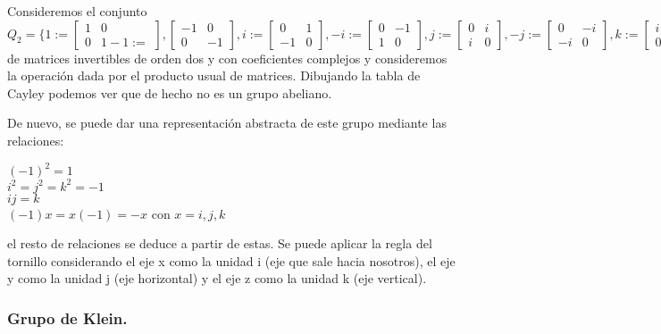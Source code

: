 \documentclass{article}
\theoremstyle{theorem-style}  %
\theoremstyle{definition-style}
\theoremstyle{example-style}
\begin{document}
Consideremos el conjunto 
$Q_2 = \{
1 := \begin{bmatrix}
    1 & 0  \\
    0 & 1 
-1 := \end{bmatrix},
\begin{bmatrix}
    -1 & 0  \\
    0 & -1 
\end{bmatrix},
i := \begin{bmatrix}
    0 & 1  \\
    -1 & 0 
\end{bmatrix},
-i := \begin{bmatrix}
    0 & -1  \\
    1 & 0 
\end{bmatrix},
j := \begin{bmatrix}
    0 & i  \\
    i & 0 
\end{bmatrix},
-j := \begin{bmatrix}
    0 & -i  \\
    -i & 0 
\end{bmatrix},
k := \begin{bmatrix}
    i & 0  \\
    0 & -i 
\end{bmatrix},
-k := \begin{bmatrix}
    -i & 0  \\
    0 & i 
\end{bmatrix} \}$
de matrices invertibles de orden dos y con coeficientes complejos y consideremos la operación dada por el producto usual de matrices. Dibujando la tabla de Cayley podemos ver que de hecho no es un grupo abeliano.

De nuevo, se puede dar una representación abstracta de este grupo mediante las relaciones:

$(-1)^2 = 1$ \\
$i^2 = j^2 = k^2 = -1$ \\
$ij = k$ \\
$(-1)x = x(-1) = -x$ con $x = i,j,k$

el resto de relaciones se deduce a partir de estas. Se puede aplicar la regla del tornillo considerando el eje x como la unidad i (eje que sale hacia nosotros), el eje y como la unidad j (eje horizontal) y el eje z como la unidad k (eje vertical).

\subsubsection{Grupo de Klein.}
\end{document}
